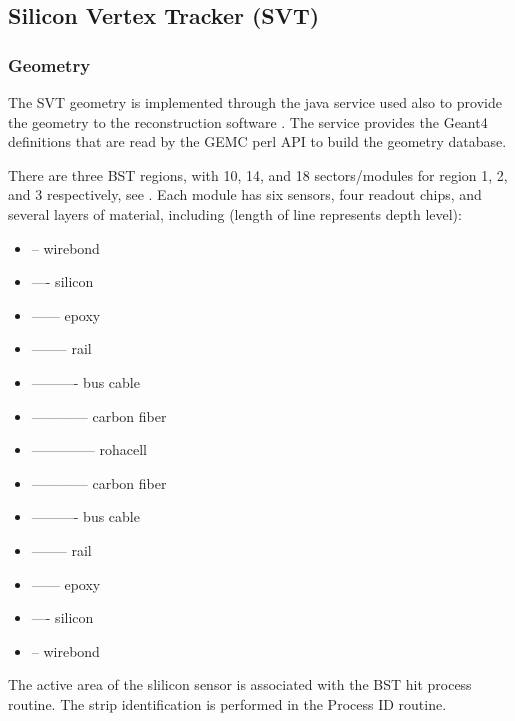 \subsection{Silicon Vertex Tracker (SVT)}


\subsubsection{Geometry}


The SVT \cite{svt2019} geometry is implemented through the java service used also to provide the geometry to the reconstruction software \cite{reco2019}.
The service provides the Geant4 definitions that are read by the GEMC perl API to build the geometry database.

There are three BST regions, with 10, 14, and 18 sectors/modules for region 1, 2, and 3 respectively, see .
Each module has six sensors, four readout chips, and several layers of material,
including (length of line represents depth level):

\begin{itemize}
	\item -- wirebond
	\item ---- silicon
	\item ------ epoxy
	\item -------- rail
	\item ---------- bus cable
	\item ------------ carbon fiber
	\item -------------- rohacell
	\item ------------ carbon fiber
	\item ---------- bus cable
	\item -------- rail
	\item ------ epoxy
	\item ---- silicon
	\item -- wirebond
\end{itemize}

The active area of the slilicon sensor is associated with the BST hit process routine.
The strip identification is performed in the Process ID routine.

